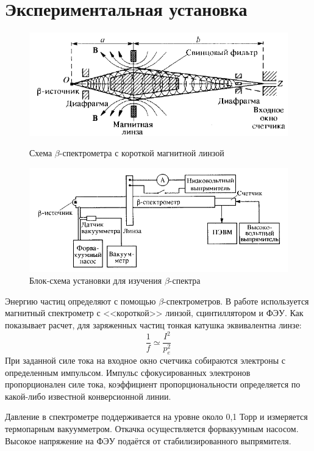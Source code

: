 \documentclass[15pt,a5paper,reqno]{article}
\begin{document}
\section{Экспериментальная установка}

    \begin{figure}[h]
\begin{center}
\begin{minipage}[h]{0.48\linewidth}
\includegraphics[width=1\linewidth]{pics/lens_5_4_2.png}
\caption{Схема $\beta$-спектрометра с короткой магнитной линзой} %
\end{minipage}
\hfill 
\begin{minipage}[h]{0.48\linewidth}
\includegraphics[width=1\linewidth]{pics/stff_5_4_2.png}
\caption{Блок-схема установки для изучения $\beta$-спектра}
\label{ris:experimcoded}
\end{minipage}
\end{center}
\end{figure}

Энергию частиц определяют с помощью $\beta$-спектрометров. В работе используется магнитный спектрометр с <<короткой>> линзой, сцинтиллятором и ФЭУ. Как показывает расчет, для заряженных частиц тонкая катушка эквивалентна линзе:
		\begin{equation}
			\frac{1}{f} \simeq \frac{I^2}{p_e^2}
		\end{equation}
	При заданной силе тока на входное окно счетчика собираются электроны с определенным импульсом. Импульс сфокусированных электронов пропорционален силе тока, коэффициент пропорциональности определяется по какой-либо известной конверсионной линии. \par
	Давление в спектрометре поддерживается на уровне около 0,1 Торр и измеряется термопарным вакуумметром. Откачка осуществляется форвакуумным насосом. Высокое напряжение на ФЭУ подаётся от стабилизированного выпрямителя.
\end{document}

